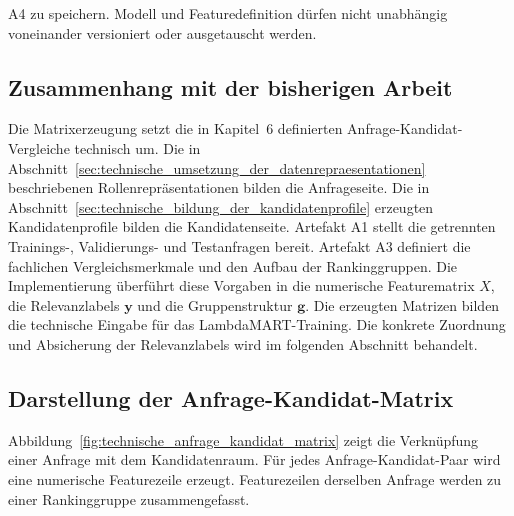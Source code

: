 A4 zu speichern. Modell und Featuredefinition dürfen nicht unabhängig voneinander versioniert oder ausgetauscht werden. \subsection{Zusammenhang mit der bisherigen Arbeit} \label{subsec:zusammenhang_anfrage_kandidat_matrix} Die Matrixerzeugung setzt die in Kapitel~6 definierten Anfrage-Kandidat-Vergleiche technisch um. Die in Abschnitt~\ref{sec:technische_umsetzung_der_datenrepraesentationen} beschriebenen Rollenrepräsentationen bilden die Anfrageseite. Die in Abschnitt~\ref{sec:technische_bildung_der_kandidatenprofile} erzeugten Kandidatenprofile bilden die Kandidatenseite. Artefakt A1 stellt die getrennten Trainings-, Validierungs- und Testanfragen bereit. Artefakt A3 definiert die fachlichen Vergleichsmerkmale und den Aufbau der Rankinggruppen. Die Implementierung überführt diese Vorgaben in die numerische Featurematrix $X$, die Relevanzlabels $\boldsymbol{y}$ und die Gruppenstruktur $\boldsymbol{g}$. Die erzeugten Matrizen bilden die technische Eingabe für das LambdaMART-Training. Die konkrete Zuordnung und Absicherung der Relevanzlabels wird im folgenden Abschnitt behandelt. \subsection{Darstellung der Anfrage-Kandidat-Matrix} \label{subsec:darstellung_anfrage_kandidat_matrix} Abbildung~\ref{fig:technische_anfrage_kandidat_matrix} zeigt die Verknüpfung einer Anfrage mit dem Kandidatenraum. Für jedes Anfrage-Kandidat-Paar wird eine numerische Featurezeile erzeugt. Featurezeilen derselben Anfrage werden zu einer Rankinggruppe zusammengefasst. 
